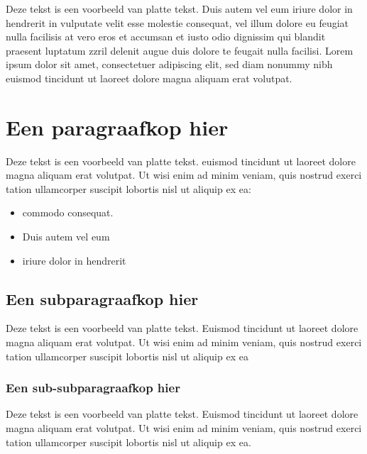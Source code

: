 \documentclass[dutch]{uureport}
\begin{document}
Deze tekst is een voorbeeld van platte tekst. Duis autem vel eum
iriure dolor in hendrerit in vulputate velit esse molestie consequat,
vel illum dolore eu feugiat nulla facilisis at vero eros et accumsan
et iusto odio dignissim qui blandit praesent luptatum zzril delenit
augue duis dolore te feugait nulla facilisi. Lorem ipsum dolor sit
amet, consectetuer adipiscing elit, sed diam nonummy nibh euismod tincidunt ut laoreet dolore magna aliquam erat volutpat.

\section{Een paragraafkop hier}

Deze tekst is een voorbeeld van platte tekst. euismod tincidunt ut laoreet dolore magna aliquam erat volutpat. Ut wisi enim ad minim veniam, quis nostrud exerci tation ullamcorper suscipit lobortis nisl ut aliquip ex ea:
\begin{itemize}
  \item	commodo consequat.
  \item	Duis autem vel eum 
  \item	iriure dolor in hendrerit
\end{itemize}

\subsection{Een subparagraafkop hier}

Deze tekst is een voorbeeld van platte tekst. Euismod tincidunt ut laoreet dolore magna aliquam erat volutpat. Ut wisi enim ad minim veniam, quis nostrud exerci tation ullamcorper suscipit lobortis nisl ut aliquip ex ea

\subsubsection{Een sub-subparagraafkop hier}

Deze tekst is een voorbeeld van platte tekst. Euismod tincidunt ut laoreet dolore magna aliquam erat volutpat. Ut wisi enim ad minim veniam, quis nostrud exerci tation ullamcorper suscipit lobortis nisl ut aliquip ex ea.
\end{document}
